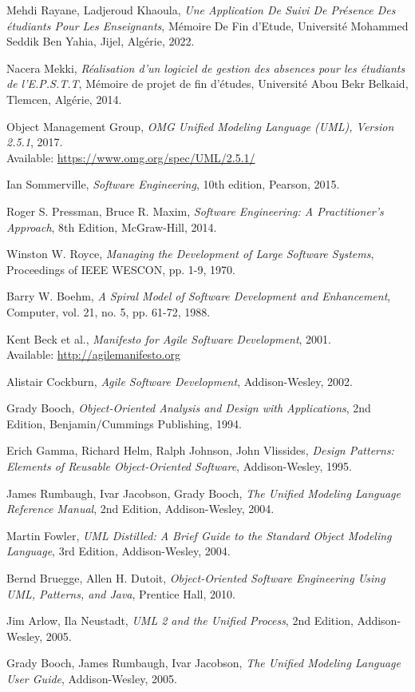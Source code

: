 \documentclass[12pt,a4paper]{report}
\begin{document}
\begin{thebibliography}{9}
Mehdi Rayane, Ladjeroud Khaoula, \textit{Une Application De Suivi De Présence Des étudiants Pour Les Enseignants}, Mémoire De Fin d'Etude, Université Mohammed Seddik Ben Yahia, Jijel, Algérie, 2022.

Nacera Mekki, \textit{Réalisation d'un logiciel de gestion des absences pour les étudiants de l'E.P.S.T.T}, Mémoire de projet de fin d'études, Université Abou Bekr Belkaid, Tlemcen, Algérie, 2014.

Object Management Group, \textit{OMG Unified Modeling Language (UML), Version 2.5.1}, 2017.\\
Available: \url{https://www.omg.org/spec/UML/2.5.1/}

Ian Sommerville, \textit{Software Engineering}, 10th edition, Pearson, 2015.

Roger S. Pressman, Bruce R. Maxim, \textit{Software Engineering: A Practitioner's Approach}, 8th Edition, McGraw-Hill, 2014.

Winston W. Royce, \textit{Managing the Development of Large Software Systems}, Proceedings of IEEE WESCON, pp. 1-9, 1970.

Barry W. Boehm, \textit{A Spiral Model of Software Development and Enhancement}, Computer, vol. 21, no. 5, pp. 61-72, 1988.

Kent Beck et al., \textit{Manifesto for Agile Software Development}, 2001.\\
Available: \url{http://agilemanifesto.org}

Alistair Cockburn, \textit{Agile Software Development}, Addison-Wesley, 2002.

Grady Booch, \textit{Object-Oriented Analysis and Design with Applications}, 2nd Edition, Benjamin/Cummings Publishing, 1994.

Erich Gamma, Richard Helm, Ralph Johnson, John Vlissides, \textit{Design Patterns: Elements of Reusable Object-Oriented Software}, Addison-Wesley, 1995.

James Rumbaugh, Ivar Jacobson, Grady Booch, \textit{The Unified Modeling Language Reference Manual}, 2nd Edition, Addison-Wesley, 2004.


Martin Fowler, \textit{UML Distilled: A Brief Guide to the Standard Object Modeling Language}, 3rd Edition, Addison-Wesley, 2004.

Bernd Bruegge, Allen H. Dutoit, \textit{Object-Oriented Software Engineering Using UML, Patterns, and Java}, Prentice Hall, 2010.

Jim Arlow, Ila Neustadt, \textit{UML 2 and the Unified Process}, 2nd Edition, Addison-Wesley, 2005.

Grady Booch, James Rumbaugh, Ivar Jacobson, \textit{The Unified Modeling Language User Guide}, Addison-Wesley, 2005.

\end{thebibliography}
\end{document}
